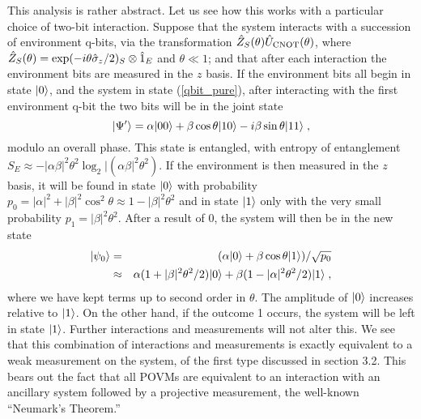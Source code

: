 This analysis is rather abstract.  Let us see how this works with
a particular choice of two-bit interaction.  Suppose that the
system interacts with a succession of environment q-bits,
via the transformation ${\hat Z}_S(\theta){\hat U}_{\rm CNOT}(\theta)$,
where ${\hat Z}_S(\theta) = \exp(-i\theta{\hat\sigma_z}/2)_S\otimes{\hat 1}_E$
and $\theta \ll 1$; and that after each interaction the environment bits
are measured in the $z$ basis.  If the environment bits all begin in state
${| 0 \rangle}$, and the system in state (\ref{qbit_pure}), after interacting with
the first environment q-bit the two bits will be in the joint state
\begin{equation}
{| \Psi' \rangle} = \alpha{| 00 \rangle} + \beta\cos\theta{| 10 \rangle}
  - i \beta\sin\theta{| 11 \rangle} \;,
\label{weakCNOT}
\end{equation}
modulo an overall phase.
This state is entangled, with entropy of entanglement
$S_E \approx - |\alpha\beta|^2\theta^2 \log_2|(\alpha\beta|^2\theta^2)$.
If the environment is then measured in the $z$ basis, it will be found in
state ${| 0 \rangle}$ with probability
$p_0 = |\alpha|^2 + |\beta|^2\cos^2\theta \approx 1 - |\beta|^2\theta^2$
and in state ${| 1 \rangle}$ only with the very small probability
$p_1 = |\beta|^2\theta^2$.  After a result of 0, the system will then be
in the new state
\begin{eqnarray}
{| \psi_0 \rangle} &=& (\alpha{| 0 \rangle}
  + \beta\cos\theta{| 1 \rangle})/\sqrt{p_0} \nonumber\\
&\approx& \alpha (1+|\beta|^2\theta^2/2) {| 0 \rangle}
  + \beta (1-|\alpha|^2\theta^2/2) {| 1 \rangle} \;,
\end{eqnarray}
where we have kept terms up to second order in $\theta$.
The amplitude of ${| 0 \rangle}$ increases relative to ${| 1 \rangle}$.  On the other hand,
if the outcome 1 occurs, the system will be left in state ${| 1 \rangle}$.
Further interactions and measurements will not alter this.  We see that
this combination of interactions and measurements is exactly equivalent
to a weak measurement on the system, of the first type discussed in
section 3.2.
This bears out the fact that all POVMs are equivalent
to an interaction with an ancillary system followed by a projective
measurement, the well-known ``Neumark's Theorem.''

